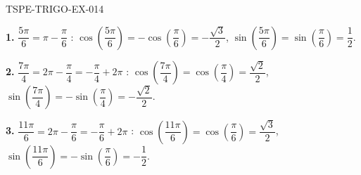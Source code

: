 \begin{corrige}{TSPE-TRIGO-EX-014}

\textbf{1.} $\dfrac{5\pi}{6} = \pi - \dfrac{\pi}{6}$ :
$\cos\!\left(\dfrac{5\pi}{6}\right) = -\cos\!\left(\dfrac{\pi}{6}\right) = -\dfrac{\sqrt{3}}{2}$, \quad
$\sin\!\left(\dfrac{5\pi}{6}\right) = \sin\!\left(\dfrac{\pi}{6}\right) = \dfrac{1}{2}$.

\textbf{2.} $\dfrac{7\pi}{4} = 2\pi - \dfrac{\pi}{4} = -\dfrac{\pi}{4} + 2\pi$ :
$\cos\!\left(\dfrac{7\pi}{4}\right) = \cos\!\left(\dfrac{\pi}{4}\right) = \dfrac{\sqrt{2}}{2}$, \quad
$\sin\!\left(\dfrac{7\pi}{4}\right) = -\sin\!\left(\dfrac{\pi}{4}\right) = -\dfrac{\sqrt{2}}{2}$.

\textbf{3.} $\dfrac{11\pi}{6} = 2\pi - \dfrac{\pi}{6} = -\dfrac{\pi}{6} + 2\pi$ :
$\cos\!\left(\dfrac{11\pi}{6}\right) = \cos\!\left(\dfrac{\pi}{6}\right) = \dfrac{\sqrt{3}}{2}$, \quad
$\sin\!\left(\dfrac{11\pi}{6}\right) = -\sin\!\left(\dfrac{\pi}{6}\right) = -\dfrac{1}{2}$.

\end{corrige}
